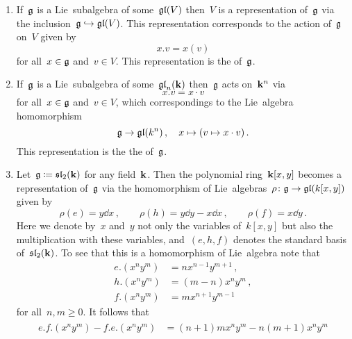 \begin{examples}
  \label{examples for representations}
  \leavevmode
  \begin{enumerate}[leftmargin=*]
    \item 
      If~$\mathfrak{g}$ is a Lie~subalgebra of some~$\mathfrak{gl}(V)$ then~$V$ is a representation of~$\mathfrak{g}$ via the inclusion~$\mathfrak{g} \hookrightarrow \mathfrak{gl}(V)$.
      This representation corresponds to the action of~$\mathfrak{g}$ on~$V$ given by
      \[
        x.v
        =
        x(v)
      \]
      for all~$x \in \mathfrak{g}$ and~$v \in V$.
      This representation is the  of~$\mathfrak{g}$.
    \item
      If~$\mathfrak{g}$ is a Lie~subalgebra of some~$\mathfrak{gl}_n(\mathbf{k})$ then~$\mathfrak{g}$ acts on~$\mathbf{k}^n$ via
      \[
        x.v
        =
        x \cdot v
      \]
      for all~$x \in \mathfrak{g}$ and~$v \in V$, which correspondings to the Lie~algebra homomorphism
      \[
        \mathfrak{g}
        \to
        \mathfrak{gl}(k^n) \,,
        \quad
        x
        \mapsto
        (v \mapsto x \cdot v) \,.
      \]
      This representation is the the  of~$\mathfrak{g}$.
    \item
      Let~$\mathfrak{g} \coloneqq \mathfrak{sl}_2(\mathbf{k})$ for any field~$\mathbf{k}$.
      Then the polynomial ring~$\mathbf{k}[x,y]$ becomes a representation of~$\mathfrak{g}$ via the homomorphism of Lie~algebras~$\rho \colon \mathfrak{g} \to \mathfrak{gl}(k[x,y])$ given by
      \[
        \rho(e) = y \dd{x} \,,
        \qquad
        \rho(h) = y \dd{y} - x \dd{x} \,,
        \qquad
        \rho(f) = x \dd{y}  \,.
      \]
      Here we denote by~$x$ and~$y$ not only the variables of~$k[x,y]$ but also the multiplication with these variables, and~$(e,h,f)$ denotes the standard basis of~$\mathfrak{sl}_2(\mathbf{k})$.
      To see that this is a homomorphism of Lie~algebra note that
      \begin{align*}
        e.(x^n y^m)
        &=
        n x^{n-1} y^{m+1} \,, \\
        h.(x^n y^m)
        &=
        (m-n) x^n y^m \,, \\
        f.(x^n y^m)
        &=
        m x^{n+1} y^{m-1}
      \end{align*}
      for all~$n, m \geq 0$.
      It follows that
      \begin{gather*}
        \begin{aligned}
        e.f.(x^n y^m) - f.e.(x^n y^m)
        &=
        (n+1)m x^n y^m - n(m+1) x^n y^m
        \\

\end{aligned}
\end{gather*}
\end{enumerate}
\end{examples}
